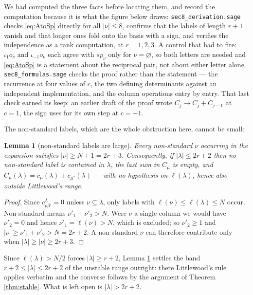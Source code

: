 \documentclass[11pt,reqno]{amsart}
\theoremstyle{plain}
\newtheorem{lemma}[theorem]{Lemma}
\theoremstyle{definition}
\begin{document}
We had computed the three facts before locating them, and record the computation because it is what
the figure below draws: \texttt{sec8\_derivation.sage} checks \eqref{eq:AtoSp} directly for all
$|\nu|\le8$, confirms that the labels of length $r+1$ vanish and that longer ones fold onto the basis
with a sign, and verifies the independence as a rank computation, at $r=1,2,3$. A control that had to
fire: $\iota_1 o_\nu$ and $\iota_{-1}o_\nu$ each agree with $sp_\nu$ only for $\nu=\varnothing$, so
both letters are needed and \eqref{eq:AtoSp} is a statement about the reciprocal pair, not about
either letter alone. \texttt{sec8\_formulas.sage} checks the proof rather than the statement --- the
recurrence at four values of $c$, the two defining determinants against an independent
implementation, and the column operations entry by entry. That last check earned its keep: an earlier
draft of the proof wrote $C_j\to C_j+C_{j-1}$ at $c=1$, the sign \cite[Lemma 3.2]{AK25} uses for its
own step at $c=-1$.

The non-standard labels, which are the whole obstruction here, cannot be small:

\begin{lemma}[non-standard labels are large]\label{lem:nonstd}
Every non-standard $\nu$ occurring in the expansion satisfies $|\nu|\ge N+1=2r+3$. Consequently, if
$|\lambda|\le2r+2$ then no non-standard label is contained in $\lambda$, the last sum in $C_\mu$ is
empty, and $C_\mu(\lambda)=c_\mu(\lambda)\pm c_{\mu^{*}}(\lambda)$ --- with no hypothesis on
$\ell(\lambda)$, hence also outside Littlewood's range.
\end{lemma}

\begin{proof}
Since $c^{\lambda}_{\nu\beta'}=0$ unless $\nu\subseteq\lambda$, only labels with
$\ell(\nu)\le\ell(\lambda)\le N$ occur. Non-standard means $\nu'_1+\nu'_2>N$. Were $\nu$ a single
column we would have $\nu'_2=0$ and hence $\nu'_1=\ell(\nu)>N$, which is excluded; so $\nu'_2\ge1$ and
$|\nu|\ge\nu'_1+\nu'_2>N=2r+2$. A non-standard $\nu$ can therefore contribute only when
$|\lambda|\ge|\nu|\ge2r+3$.
\end{proof}

\noindent Since $\ell(\lambda)>N/2$ forces $|\lambda|\ge r+2$, Lemma \ref{lem:nonstd} settles the
band $r+2\le|\lambda|\le2r+2$ of the unstable range outright: there Littlewood's rule applies
verbatim and the converse follows by the argument of Theorem \ref{thm:stable}. What is left open is
$|\lambda|>2r+2$.
\end{document}
